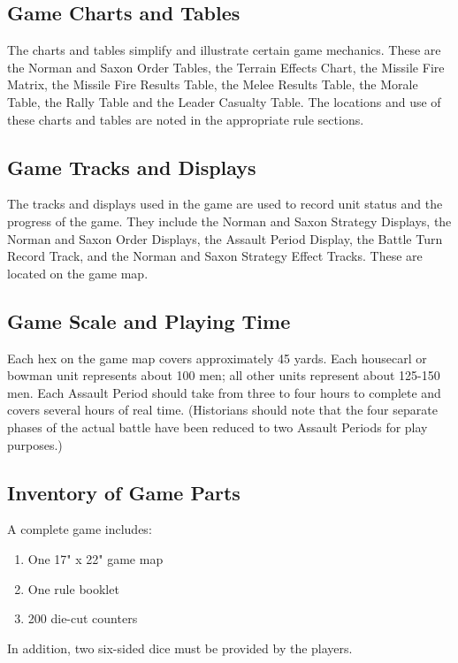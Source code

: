 \subsection{Game Charts and Tables}

The charts and tables simplify and illustrate certain game mechanics. These are the Norman and Saxon Order Tables, the Terrain Effects Chart, the Missile Fire Matrix, the Missile Fire Results Table, the Melee Results Table, the Morale Table, the Rally Table and the Leader Casualty Table. The locations and use of these charts and tables are noted in the appropriate rule sections.

\subsection{Game Tracks and Displays}

The tracks and displays used in the game are used to record unit status and the progress of the game. They include the Norman and Saxon Strategy Displays, the Norman and Saxon Order Displays, the Assault Period Display, the Battle Turn Record Track, and the Norman and Saxon Strategy Effect Tracks. These are located on the game map.

\subsection{Game Scale and Playing Time}

Each hex on the game map covers approximately 45 yards. Each housecarl or bowman unit represents about 100 men; all other units represent about 125-150 men. Each Assault Period should take from three to four hours to complete and covers several hours of real time. (Historians should note that the four separate phases of the actual battle have been reduced to two Assault Periods for play purposes.)

\subsection{Inventory of Game Parts}

A complete game includes:

\begin{enumerate}[label=*]
    \item One 17" x 22" game map
    \item One rule booklet
    \item 200 die-cut counters
\end{enumerate}

In addition, two six-sided dice must be provided by the players.